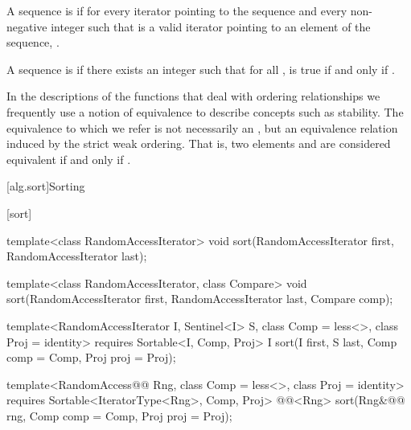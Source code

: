 \pnum
A sequence is
 if for every iterator
pointing to the sequence and every non-negative integer
such that
is a valid iterator pointing to an element of the sequence,
.

\pnum
A sequence
is
if there exists an integer
such that for all
,
is true if and only if
.

\pnum
In the descriptions of the functions that deal with ordering relationships we frequently use a notion of
equivalence to describe concepts such as stability.
The equivalence to which we refer is not necessarily an
,
but an equivalence relation induced by the strict weak ordering.
That is, two elements
and
are considered equivalent if and only if
.

[alg.sort]{Sorting}

[sort]{}

%
\begin{removedblock}
\begin{itemdecl}
template<class RandomAccessIterator>
  void sort(RandomAccessIterator first, RandomAccessIterator last);

template<class RandomAccessIterator, class Compare>
  void sort(RandomAccessIterator first, RandomAccessIterator last,
            Compare comp);
\end{itemdecl}
\end{removedblock}
\begin{addedblock}
\begin{itemdecl}
template<RandomAccessIterator I, Sentinel<I> S, class Comp = less<>,
    class Proj = identity>
  requires Sortable<I, Comp, Proj>
  I sort(I first, S last, Comp comp = Comp{}, Proj proj = Proj{});

template<RandomAccess@@ Rng, class Comp = less<>, class Proj = identity>
  requires Sortable<IteratorType<Rng>, Comp, Proj>
  @@<Rng>
    sort(Rng&@\newtxt{\&}@ rng, Comp comp = Comp{}, Proj proj = Proj{});
\end{itemdecl}
\end{addedblock}

